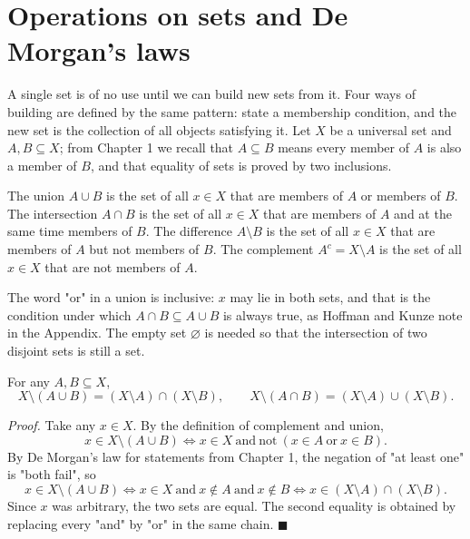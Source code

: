 \section{Operations on sets and De Morgan's laws}

A single set is of no use until we can build new sets from it. Four ways of building
are defined by the same pattern: state a membership condition, and the new set is the
collection of all objects satisfying it. Let $X$ be a universal set and
$A, B \subseteq X$; from Chapter 1 we recall that $A \subseteq B$ means every member
of $A$ is also a member of $B$, and that equality of sets is proved by two inclusions.

\begin{definisi}
The union $A \cup B$ is the set of all $x \in X$ that are members of $A$ or members
of $B$. The intersection $A \cap B$ is the set of all $x \in X$ that are members of
$A$ and at the same time members of $B$. The difference $A \setminus B$ is the set of
all $x \in X$ that are members of $A$ but not members of $B$. The complement
$A^{c} = X \setminus A$ is the set of all $x \in X$ that are not members of $A$.
\end{definisi}

The word "or" in a union is inclusive: $x$ may lie in both sets, and that is the
condition under which $A \cap B \subseteq A \cup B$ is always true, as Hoffman and
Kunze note in the Appendix. The empty set $\varnothing$ is needed so that the
intersection of two disjoint sets is still a set.

\begin{proposisi}
For any $A, B \subseteq X$,
\[
  X \setminus (A \cup B) = (X \setminus A) \cap (X \setminus B),
  \qquad
  X \setminus (A \cap B) = (X \setminus A) \cup (X \setminus B).
\]
\end{proposisi}
\par\smallskip\noindent\textit{Proof.} Take any $x \in X$. By the definition of
complement and union,
\[
  x \in X \setminus (A \cup B)
  \iff x \in X \ \text{and}\ \text{not}\ (x \in A \ \text{or}\ x \in B).
\]
By De Morgan's law for statements from Chapter 1, the negation of "at least one" is
"both fail", so
\[
  x \in X \setminus (A \cup B)
  \iff x \in X \ \text{and}\ x \notin A \ \text{and}\ x \notin B
  \iff x \in (X \setminus A) \cap (X \setminus B).
\]
Since $x$ was arbitrary, the two sets are equal. The second equality is obtained by
replacing every "and" by "or" in the same chain.
\hfill$\blacksquare${\parfillskip=0pt\par}

